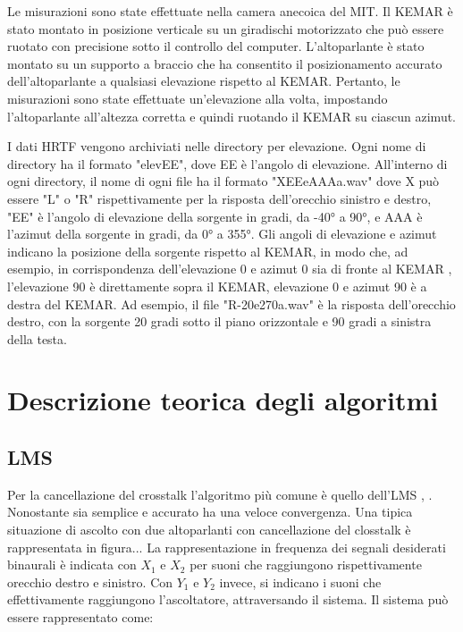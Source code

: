 \documentclass[12pt,a4paper,titlepage]{article}
\begin{document}
Le misurazioni sono state effettuate nella camera anecoica del MIT. Il KEMAR è stato montato in posizione verticale su un giradischi motorizzato che può essere ruotato con precisione sotto il controllo del computer. L'altoparlante è stato montato su un supporto a braccio che ha consentito il posizionamento accurato dell'altoparlante a qualsiasi elevazione rispetto al KEMAR. Pertanto, le misurazioni sono state effettuate un'elevazione alla volta, impostando l'altoparlante all'altezza corretta e quindi ruotando il KEMAR su ciascun azimut.

I dati HRTF vengono archiviati nelle directory per elevazione. Ogni nome di directory ha il formato "elevEE", dove EE è l'angolo di elevazione. All'interno di ogni directory, il nome di ogni file ha il formato "XEEeAAAa.wav" dove X può essere "L" o "R" rispettivamente per la risposta dell'orecchio sinistro e destro, "EE" è l'angolo di elevazione della sorgente in gradi, da -40° a 90°, e AAA è l'azimut della sorgente in gradi, da 0° a 355°. Gli angoli di elevazione e azimut indicano la posizione della sorgente rispetto al KEMAR, in modo che, ad esempio, in corrispondenza dell'elevazione 0 e azimut 0 sia di fronte al KEMAR , l'elevazione 90 è direttamente sopra il KEMAR, elevazione 0 e azimut 90 è a destra del KEMAR. Ad esempio, il file "R-20e270a.wav" è la risposta dell'orecchio destro, con la sorgente 20 gradi sotto il piano orizzontale e 90 gradi a sinistra della testa.
\clearpage
\section{Descrizione teorica degli algoritmi}
\label{sec:descrizione_teorica}
\subsection{LMS}
\label{subsec:LMS_teoria}
Per la cancellazione del crosstalk l'algoritmo più comune è quello dell'LMS \cite{143434}, \cite{4217047}.
Nonostante sia semplice e accurato ha una veloce convergenza.
Una tipica situazione di ascolto con due altoparlanti con cancellazione del closstalk è rappresentata in figura...
La rappresentazione in frequenza dei segnali desiderati binaurali è indicata con $X_1$ e $X_2$ per suoni che raggiungono rispettivamente orecchio destro e sinistro.
Con $Y_1$ e $Y_2$ invece, si indicano i suoni che effettivamente raggiungono l'ascoltatore, attraversando il sistema.
Il sistema può essere rappresentato come:
\end{document}
